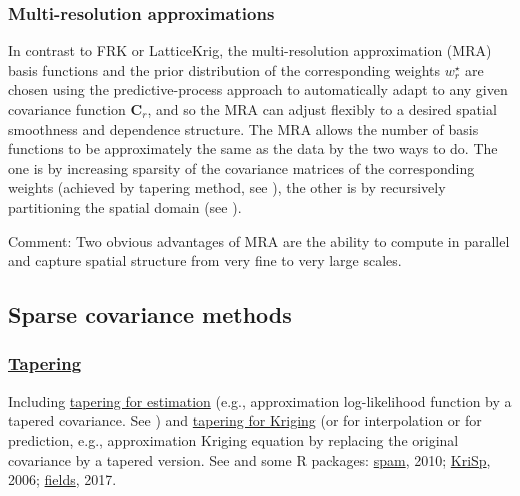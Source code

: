 \documentclass[
12pt, %
a4paper, %
oneside, %
headinclude,footinclude, %
BCOR5mm, %
]{scrartcl}
\begin{document}
\subsubsection{Multi-resolution approximations}
In contrast to FRK or LatticeKrig, the multi-resolution approximation (MRA) basis functions and the prior distribution of the corresponding weights $w_r^{\star}$ are chosen using the predictive-process approach to automatically adapt to any given covariance function $\boldsymbol{C}_r$, and so the MRA can adjust flexibly to a desired spatial smoothness and dependence structure. The MRA allows the number of basis functions to be approximately the same as the data by the two ways to do. The one is by increasing sparsity of the covariance matrices of the corresponding weights (achieved by tapering method, see  \href{https://chenyw68.github.io/Literature/[2017-formal]Parallel inference for massive distributed spatial data using low-rank models.pdf
}{\citep{katzfuss2017parallel}}), the other is by recursively partitioning the spatial domain (see \href{https://chenyw68.github.io/Literature/[2017]A Multi-Resolution Approximation for Massive Spatial Datasets.pdf}{\citep{katzfuss2017multi}}).

\textcolor[rgb]{1.00,0.00,1.00}{Comment:} Two obvious advantages of MRA are the ability to compute in parallel and capture spatial structure from very fine to very large scales.


\subsection{Sparse covariance methods}
\subsubsection{\href{https://user.math.uzh.ch/furrer/software/KriSp/}{Tapering}}
Including \href{https://chenyw68.github.io/Literature/[2008]Covariance Tapering for Likelihood Based Estimation in Large Spatial Data Sets.pdf}{tapering for estimation} (e.g.,  approximation log-likelihood function by a tapered covariance. See \href{https://chenyw68.github.io/Literature/[2008]Covariance Tapering for Likelihood Based Estimation in Large Spatial Data Sets.pdf}{\cite{kaufman2008covariance}}) and \href{https://chenyw68.github.io/Literature/[2006]Covariance tapering for interpolation of large spatial datasets.pdf}{tapering for Kriging} (or for interpolation or for prediction, e.g.,  approximation Kriging equation by replacing the original covariance by a tapered version. See \href{https://chenyw68.github.io/Literature/[2006]Covariance tapering for interpolation of large spatial datasets.pdf}{\cite{furrer2006covariance}} and some R packages: \href{https://chenyw68.github.io/Literature/[2010]spam-A Sparse Matrix R Package with Emphasis on MCMC Methods for Gaussian Markov Random Fields.pdf}{spam}, 2010; \href{https://chenyw68.github.io/Literature/[2006]KriSp.pdff}{KriSp}, 2006; \href{https://chenyw68.github.io/Literature/[2020]fields.pdf}{fields}, 2017.
\end{document}
